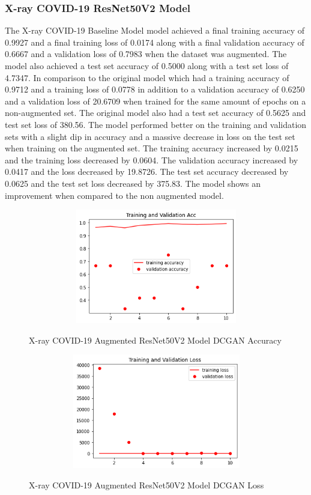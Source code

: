 \subsubsection{X-ray COVID-19 ResNet50V2 Model}
The X-ray COVID-19 Baseline Model model achieved a final training accuracy of 0.9927 and a final training loss of 0.0174 along with a final validation accuracy of 0.6667 and a validation loss of 0.7983 when the dataset was augmented.  The model also achieved a test set accuracy of 0.5000 along with a test set loss of 4.7347.  In comparison to the original model which had a training accuracy of 0.9712 and a training loss of 0.0778  in addition to a validation accuracy of 0.6250 and a validation loss of 20.6709  when trained for the same amount of epochs on a non-augmented set.  The original model also had a test set accuracy of 0.5625 and test set loss of 380.56.  The model performed better on the training and validation sets with a slight dip in accuracy and a massive decrease in loss on the test set when training on the augmented set.  The training accuracy increased by 0.0215 and the training loss decreased by 0.0604. The validation accuracy increased by 0.0417 and the loss decreased by 19.8726.  The test set accuracy decreased by 0.0625 and the test set loss decreased by 375.83.  The model shows an improvement when compared to the non augmented model.
 \begin{figure}[H]
    \centering    \includegraphics[width=1\textwidth,height=5cm,keepaspectratio]{Images/ResNet50V2BaselineTrainingValidationAccXRayCOVID19AugmentedDCGAN.png}\\
    \caption{X-ray COVID-19 Augmented ResNet50V2 Model DCGAN Accuracy}
    \label{fig:X-ray COVID-19 Augmented ResNet50V2 Model DCGAN Accuracy}
\end{figure}
 \begin{figure}[H]
    \centering
    \includegraphics[width=1\textwidth,height=5cm,keepaspectratio]{Images/ResNet50V2BaselineTrainingValidationLossXRayCOVID19AugmentedDCGAN.png}\\
    \caption{X-ray COVID-19 Augmented ResNet50V2 Model DCGAN Loss}
    \label{fig:X-ray COVID-19 Augmented ResNet50V2 Model DCGAN Loss}
\end{figure}
